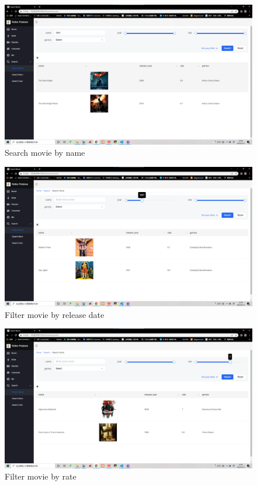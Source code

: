 \begin{CJK*}{UTF8}{gbsn}
    \begin{figure}[htbp]
    \centering
    \includegraphics[width=1\textwidth]{res_search2.png}
    \caption{Search movie by name}
    \end{figure}
    
    \begin{figure}[htbp]
    \centering
    \includegraphics[width=1\textwidth]{res_search3.png}
    \caption{Filter movie by release date}
    \end{figure}
    
    \begin{figure}[htbp]
    \centering
    \includegraphics[width=1\textwidth]{res_search4.png}
    \caption{Filter movie by rate}
    \end{figure}
    

\end{CJK*}
